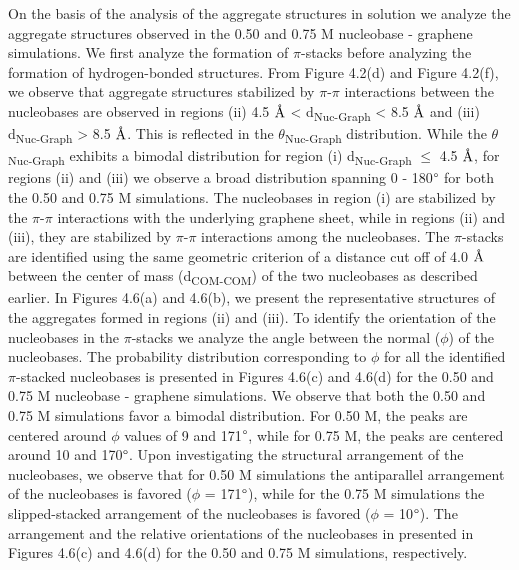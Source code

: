On the basis of the analysis of the aggregate structures in solution we analyze the aggregate structures observed in the 0.50 and 0.75 M nucleobase - graphene simulations. We first analyze the formation of $\pi$-stacks before analyzing the formation of hydrogen-bonded structures. From Figure 4.2(d) and Figure 4.2(f), we observe that aggregate structures stabilized by $\pi$-$\pi$ interactions between the nucleobases are observed in regions (ii) 4.5 $\text{\normalfont\AA}$ < d\textsubscript{Nuc-Graph} < 8.5 $\text{\normalfont\AA}$ and (iii) d\textsubscript{Nuc-Graph} > 8.5 $\text{\normalfont\AA}$. This is reflected in the $\theta$\textsubscript{Nuc-Graph} distribution. While the $\theta$\textsubscript{Nuc-Graph} exhibits a bimodal distribution for region (i) d\textsubscript{Nuc-Graph} $\leq$ 4.5 $\text{\normalfont\AA}$, for regions (ii) and (iii) we observe a broad distribution spanning 0 - 180$\degree$ for both the 0.50 and 0.75 M simulations. The nucleobases in region (i) are stabilized by the $\pi$-$\pi$ interactions with the underlying graphene sheet, while in regions (ii) and (iii), they are stabilized by $\pi$-$\pi$ interactions among the nucleobases. The $\pi$-stacks are identified using the same geometric criterion of a distance cut off of 4.0 $\text{\normalfont\AA}$ between the center of mass (d\textsubscript{COM-COM}) of the two nucleobases as described earlier. In Figures 4.6(a) and 4.6(b), we present the representative structures of the aggregates formed in regions (ii) and (iii). To identify the orientation of the nucleobases in the $\pi$-stacks we analyze the angle between the normal ($\phi$) of the nucleobases. The probability distribution corresponding to $\phi$ for all the identified $\pi$-stacked nucleobases is presented in Figures 4.6(c) and 4.6(d) for the 0.50 and 0.75 M nucleobase - graphene simulations. We observe that both the 0.50 and 0.75 M simulations favor a bimodal distribution. For 0.50 M, the peaks are centered around $\phi$ values of 9 and 171$\degree$, while for 0.75 M, the peaks are centered around 10 and 170$\degree$. Upon investigating the structural arrangement of the nucleobases, we observe that for 0.50 M simulations the antiparallel arrangement of the nucleobases is favored ($\phi$ = 171$\degree$), while for the 0.75 M simulations the slipped-stacked arrangement of the nucleobases is favored ($\phi$ = 10$\degree$). The arrangement and the relative orientations of the nucleobases in presented in Figures 4.6(c) and 4.6(d) for the 0.50 and 0.75 M simulations, respectively.

